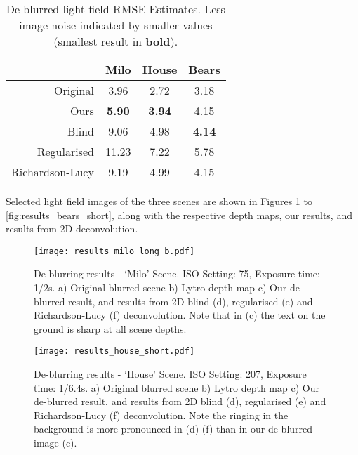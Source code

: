 \begin{table}[h]
\centering
\caption[De-blurred light field RMSE Estimates]{
De-blurred light field RMSE Estimates.
Less image noise indicated by smaller values (smallest result in \textbf{bold}).
}
\label{tab:deblurred_light_field_rmse_estimates}
\begin{tabular}[h]{r | c c c}
                & Milo           & House         & Bears         \\
\hline
Original        & 3.96           & 2.72          & 3.18          \\
Ours            & \textbf{5.90}  & \textbf{3.94} & 4.15          \\
Blind           & 9.06           & 4.98          & \textbf{4.14} \\
Regularised     & 11.23          & 7.22          & 5.78          \\
Richardson-Lucy & 9.19           & 4.99          & 4.15          \\
\end{tabular}
\end{table}


Selected light field images of the three scenes are shown in Figures \ref{fig:results_milo_long_b} to \ref{fig:results_bears_short}, along with the respective depth maps, our results, and results from 2D deconvolution.


\begin{figure}[h]
\centering
\texttt{[image: results\_milo\_long\_b.pdf]}
\caption[De-blurring results - \enquote*{Milo} Scene]{
De-blurring results - \enquote*{Milo} Scene.
ISO Setting: 75, Exposure time: 1/2s.
a) Original blurred scene b) Lytro depth map c) Our de-blurred result, and results from 2D blind (d), regularised (e) and Richardson-Lucy (f) deconvolution.
Note that in (c) the text on the ground is sharp at all scene depths.
}
\label{fig:results_milo_long_b}
\end{figure}

\begin{figure}[h]
\centering
\texttt{[image: results\_house\_short.pdf]}
\caption[De-blurring results - \enquote*{House} Scene]{
De-blurring results - \enquote*{House} Scene.
ISO Setting: 207, Exposure time: 1/6.4s.
a) Original blurred scene b) Lytro depth map c) Our de-blurred result, and results from 2D blind (d), regularised (e) and Richardson-Lucy (f) deconvolution.
Note the ringing in the background is more pronounced in (d)-(f) than in our de-blurred image (c).
}
\label{fig:results_house_short}
\end{figure}

